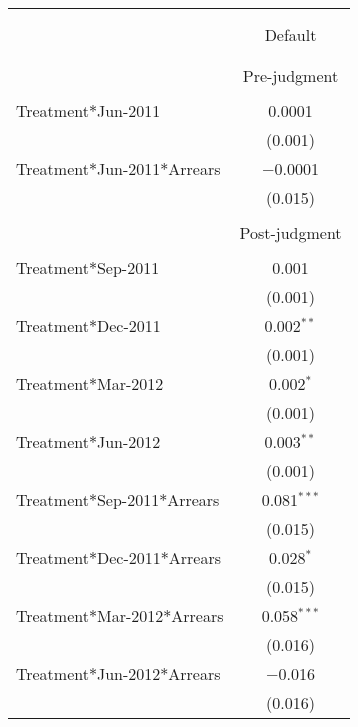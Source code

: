 
\begin{tabular}{@{\extracolsep{5pt}}lc} 
\\[-1.8ex]\hline 
\hline \\[-1.8ex] 
\\[-1.8ex] & Default \\ 
\hline \\[-1.8ex]
  &  \\  
 & Pre-judgment   \\
\hline \\[-1.8ex] 
  Treatment$*$Jun-2011 & 0.0001 \\ 
  & (0.001) \\ 
    Treatment$*$Jun-2011$*$Arrears & $-$0.0001 \\ 
	  & (0.015) \\ 
	    &  \\ 
	   & Post-judgment   \\
\hline \\[-1.8ex] 
  Treatment$*$Sep-2011 & 0.001 \\ 
  & (0.001) \\ 
  Treatment$*$Dec-2011 & 0.002$^{**}$ \\ 
  & (0.001) \\ 
  Treatment$*$Mar-2012 & 0.002$^{*}$ \\ 
  & (0.001) \\ 
  Treatment$*$Jun-2012 & 0.003$^{**}$ \\ 
  & (0.001) \\ 


  Treatment$*$Sep-2011$*$Arrears & 0.081$^{***}$ \\ 
  & (0.015) \\ 
  Treatment$*$Dec-2011$*$Arrears & 0.028$^{*}$ \\ 
  & (0.015) \\ 
  Treatment$*$Mar-2012$*$Arrears & 0.058$^{***}$ \\ 
  & (0.016) \\ 
  Treatment$*$Jun-2012$*$Arrears & $-$0.016 \\ 
  & (0.016) \\ 
\end{tabular} 
